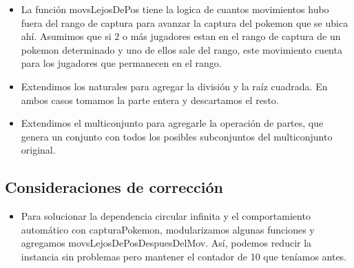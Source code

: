 \begin{itemize}
	\item La función movsLejosDePos tiene la logica de cuantos movimientos hubo fuera del rango de captura para avanzar la captura del pokemon que se ubica ahí. Asumimos que si 2 o más jugadores estan en el rango de captura de un pokemon determinado y uno de ellos sale del rango, este movimiento cuenta para los jugadores que permanecen en el rango.

	\item Extendimos los naturales para agregar la división y la raíz cuadrada. En ambos casos tomamos la parte entera y descartamos el resto.

	\item Extendimos el multiconjunto para agregarle la operación de partes, que genera un conjunto con todos los posibles subconjuntos del multiconjunto original.

\end{itemize}

\subsection{Consideraciones de corrección}

\begin{itemize}

	\item Para solucionar la dependencia circular infinita y el comportamiento automático con capturaPokemon, modularizamos algunas funciones y agregamos movsLejosDePosDespuesDelMov. Así, podemos reducir la instancia sin problemas pero mantener el contador de 10 que teníamos antes.

\end{itemize}